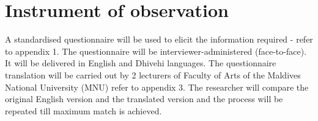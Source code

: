 
\section{Instrument of observation}

A standardised questionnaire will be used to elicit the information required - refer to appendix 1. The questionnaire will be interviewer-administered (face-to-face). It will be delivered in English and Dhivehi languages. The questionnaire translation will be carried out by 2 lecturers of Faculty of Arts of the Maldives National University (MNU) refer to appendix 3. The researcher will compare the original English version and the translated version and the process will be repeated till maximum match is achieved. 

